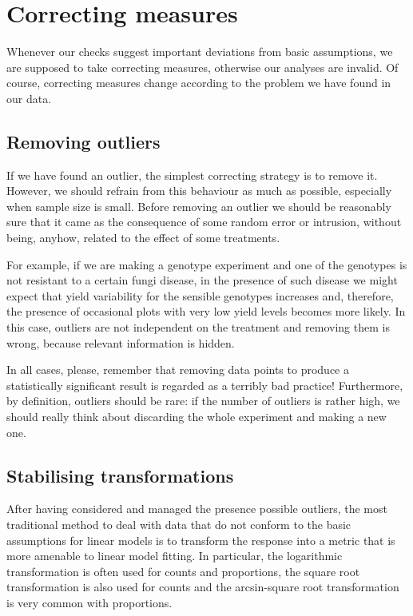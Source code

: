 \documentclass[a4paper,12pt,oneside]{book}
\begin{document}
\hypertarget{correcting-measures}{%
\section{Correcting measures}\label{correcting-measures}}

Whenever our checks suggest important deviations from basic assumptions, we are supposed to take correcting measures, otherwise our analyses are invalid. Of course, correcting measures change according to the problem we have found in our data.

\hypertarget{removing-outliers}{%
\subsection{Removing outliers}\label{removing-outliers}}

If we have found an outlier, the simplest correcting strategy is to remove it. However, we should refrain from this behaviour as much as possible, especially when sample size is small. Before removing an outlier we should be reasonably sure that it came as the consequence of some random error or intrusion, without being, anyhow, related to the effect of some treatments.

For example, if we are making a genotype experiment and one of the genotypes is not resistant to a certain fungi disease, in the presence of such disease we might expect that yield variability for the sensible genotypes increases and, therefore, the presence of occasional plots with very low yield levels becomes more likely. In this case, outliers are not independent on the treatment and removing them is wrong, because relevant information is hidden.

In all cases, please, remember that removing data points to produce a statistically significant result is regarded as a terribly bad practice! Furthermore, by definition, outliers should be rare: if the number of outliers is rather high, we should really think about discarding the whole experiment and making a new one.

\hypertarget{stabilising-transformations}{%
\subsection{Stabilising transformations}\label{stabilising-transformations}}

After having considered and managed the presence possible outliers, the most traditional method to deal with data that do not conform to the basic assumptions for linear models is to transform the response into a metric that is more amenable to linear model fitting. In particular, the logarithmic transformation is often used for counts and proportions, the square root transformation is also used for counts and the arcsin-square root transformation is very common with proportions.
\end{document}

